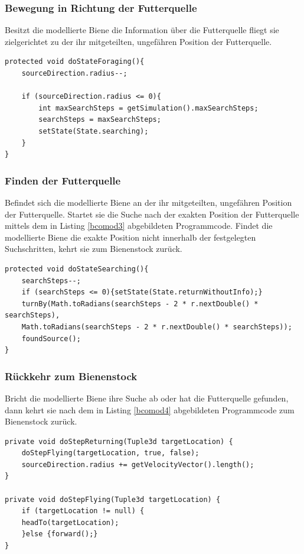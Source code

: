 \documentclass[a4paper, 11pt]{article}
\begin{document}
\subsubsection{Bewegung in Richtung der Futterquelle}
Besitzt die modellierte Biene die Information über die Futterquelle fliegt sie zielgerichtet zu der ihr mitgeteilten, ungefähren Position der Futterquelle.\newline
\begin{lstlisting}[caption= Bienen: Bewegung in Richtung der Futterquelle,label = bcomod2]
protected void doStateForaging(){
	sourceDirection.radius--;

	if (sourceDirection.radius <= 0){
		int maxSearchSteps = getSimulation().maxSearchSteps;
		searchSteps = maxSearchSteps;
		setState(State.searching);
	}
}
\end{lstlisting}
\subsubsection{Finden der Futterquelle}
Befindet sich die modellierte Biene an der ihr mitgeteilten, ungefähren Position der Futterquelle. Startet sie die Suche nach der exakten Position der Futterquelle mittels dem in Listing \ref{bcomod3} abgebildeten Programmcode. Findet die modellierte Biene die exakte Position nicht innerhalb der festgelegten Suchschritten, kehrt sie zum Bienenstock zurück.\newline
\begin{lstlisting}[caption= Bienen: Finden der Futterquelle,label = bcomod3]
protected void doStateSearching(){
	searchSteps--;
	if (searchSteps <= 0){setState(State.returnWithoutInfo);}
	turnBy(Math.toRadians(searchSteps - 2 * r.nextDouble() * searchSteps),
	Math.toRadians(searchSteps - 2 * r.nextDouble() * searchSteps));
	foundSource();
}
\end{lstlisting}
\subsubsection{Rückkehr zum Bienenstock}
Bricht die modellierte Biene ihre Suche ab oder hat die Futterquelle gefunden, dann kehrt sie nach dem in Listing \ref{bcomod4} abgebildeten Programmcode zum Bienenstock zurück.\newline
\begin{lstlisting}[caption= Bienen:Rückkehr zum Bienenstock,label = bcomod4]
private void doStepReturning(Tuple3d targetLocation) {
	doStepFlying(targetLocation, true, false);
	sourceDirection.radius += getVelocityVector().length();
}

private void doStepFlying(Tuple3d targetLocation) {
	if (targetLocation != null) {
	headTo(targetLocation);
	}else {forward();}
}
\end{lstlisting}
\newpage
\end{document}
